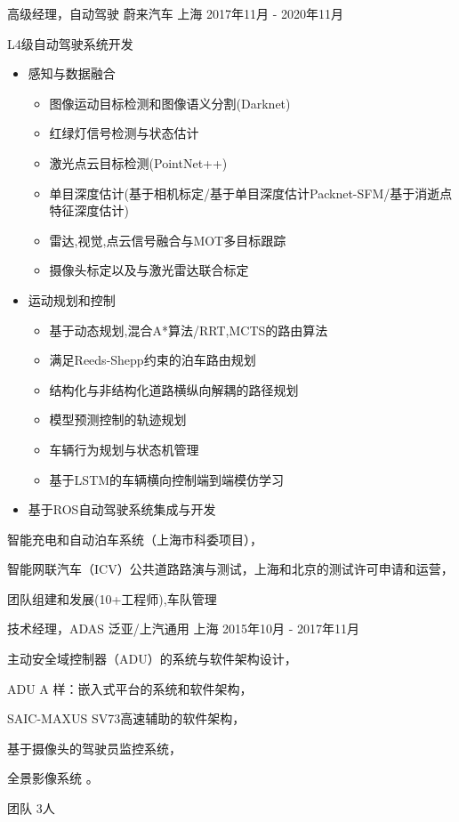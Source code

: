 \documentclass[../cv_cn.tex]{subfiles}
\begin{document}
\begin{cventries}
	\cventry
	{高级经理，自动驾驶} %
	{蔚来汽车} %
	{上海} %
	{2017年11月 - 2020年11月} %
	{
		\begin{cvitems}
			\item L4级自动驾驶系统开发
			\begin{itemize}
				\item 感知与数据融合
				  \begin{itemize}
					\item 图像运动目标检测和图像语义分割(Darknet)
					\item 红绿灯信号检测与状态估计
					\item 激光点云目标检测(PointNet++)
					\item 单目深度估计(基于相机标定/基于单目深度估计Packnet-SFM/基于消逝点特征深度估计)
					\item 雷达,视觉,点云信号融合与MOT多目标跟踪
					\item 摄像头标定以及与激光雷达联合标定
				  \end{itemize}
				\item 运动规划和控制
				  \begin{itemize}
				  	\item 基于动态规划,混合A*算法/RRT,MCTS的路由算法
					\item 满足Reeds-Shepp约束的泊车路由规划
					\item 结构化与非结构化道路横纵向解耦的路径规划
					\item 模型预测控制的轨迹规划
					\item 车辆行为规划与状态机管理
					\item 基于LSTM的车辆横向控制端到端模仿学习
				  \end{itemize}
				\item 基于ROS自动驾驶系统集成与开发
			\end{itemize}
			\item 智能充电和自动泊车系统（上海市科委项目），
			\item 智能网联汽车（ICV）公共道路路演与测试，上海和北京的测试许可申请和运营，
			\item 团队组建和发展(10+工程师),车队管理
		\end{cvitems}
	}

	\cventry
	{技术经理，ADAS} %
	{泛亚/上汽通用} %
	{上海} %
	{2015年10月 - 2017年11月} %
	{
		\begin{cvitems}
			\item 主动安全域控制器（ADU）的系统与软件架构设计，
			\item ADU A 样：嵌入式平台的系统和软件架构，
			\item SAIC-MAXUS SV73高速辅助的软件架构，
			\item 基于摄像头的驾驶员监控系统，
			\item 全景影像系统 \supercite{Xin_RearView_17}。
			\item 团队 3人
		\end{cvitems}
	}



\end{cventries}
\end{document}
